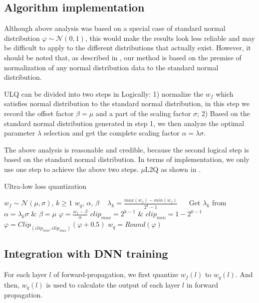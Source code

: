 \subsection{Algorithm implementation}
Although above analysis was based on a special case of standard normal distribution $\varphi \sim \mathcal{N}(0,1)$, this would make the results look less reliable and may be difficult to apply to the different distributions that actually exist. 
However, it should be noted that, as described in , our method is based on the premise of normalization of any normal distribution data to the standard normal distribution. 

ULQ can be divided into two steps in Logically: 1) normalize the  $w_f$ which satisfies normal distribution to the standard normal distribution, in this step we record the offset factor $\beta=\mu$ and a part of the scaling factor $\sigma$; 2) Based on the standard normal distribution generated in step 1, we then analyze the optimal parameter $\lambda$ selection and get the complete scaling factor $\alpha=\lambda\sigma$.

The above analysis is reasonable and credible, because the second logical step is based on the standard normal distribution. In terms of implementation, we only use one step to achieve the above two steps. $\mu$L2Q as shown in .
\renewcommand{\arraystretch}{1.3}
\begin{algorithm}[htbp] %
\caption{Ultra-low loss quantization} %
\label{alg:ulq} %
\begin{algorithmic}[1] %
\Require  $w_f \sim \mathcal{N}(\mu,\sigma)$, $k\ge 1$ 
\Ensure $w_q$, $\alpha$, $\beta$ 
\State $\lambda_k=\frac{max(w_f)-min(w_f)}{2^k-1}$ 
\Else 
\State Get $\lambda_k$ from 
\EndIf 
\State $\alpha = \lambda_k\sigma$ \& $\beta=\mu$ 
\State $\varphi = \frac{w_f-\beta}{\alpha}$
\State $clip_{max}=2^{k-1}$ \& $clip_{min}=1-2^{k-1}$
\State $\varphi= Clip_{(clip_{min},clip_{max})}(\varphi+0.5)$
\State $w_q=Round(\varphi)$
\end{algorithmic} 
\end{algorithm}

\subsection{Integration with DNN training}
For each layer $l$ of forward-propagation, we first quantize $w_f(l)$ to $w_q(l)$. 
And then, $w_q(l)$ is used to calculate the output of each layer $l$ in forward propagation.

